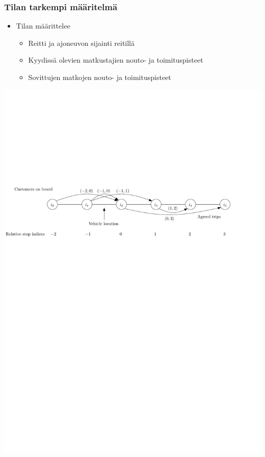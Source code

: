\documentclass{beamer}
\begin{document}
\begin{frame}
  \frametitle{Tilan tarkempi määritelmä}   %
  \begin{itemize}
\item
Tilan määrittelee
\begin{itemize}
 \item 
 Reitti ja ajoneuvon sijainti reitillä
 \item
 Kyydissä olevien matkustajien nouto- ja toimituspisteet
 \item
 Sovittujen matkojen nouto- ja toimituspisteet
\end{itemize}
\end{itemize}
\begin{center}
 \includegraphics[scale=0.55]{statekuva01}
\end{center}

\end{frame}    
    
\end{document}
